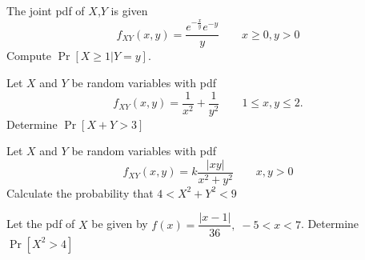 \documentclass[../main.tex]{subfiles}
\begin{document}
\begin{example}
	The joint pdf of $X$,$Y$ is given
	$$f_{XY}(x,y) = \dfrac{e^{-\frac{x}{y}}e^{-y}}{y}\qquad x\geq 0, y>0$$
	Compute $\Pr[X \geq 1 | Y=y]$.
\end{example}

\begin{example}
	Let $X$ and $Y$ be random variables with pdf $$f_{XY}(x,y) = \dfrac{1}{x^2} + 
	\dfrac{1}{y^2} \qquad 1\leq x,y \leq 2. $$ Determine $\Pr[X+Y>3]$
\end{example}

\begin{example}
	Let $X$ and $Y$ be random variables with pdf 
	$$f_{XY}(x,y) = k \dfrac{|xy|}{x^2+y^2} \qquad x,y > 0$$ Calculate the probability
	that $4 < X^2+Y^2 < 9$
\end{example}

\begin{example}
	Let the pdf of $X$ be given by $f(x) = \dfrac{|x-1|}{36},\;-5<x<7$. Determine
	$\Pr[X^2 > 4]$
\end{example}
\end{document}
